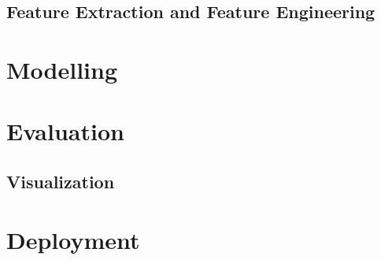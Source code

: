\subsection{Feature Extraction and Feature Engineering}

\section{Modelling}
\section{Evaluation}
\subsection{Visualization}
\section{Deployment}
